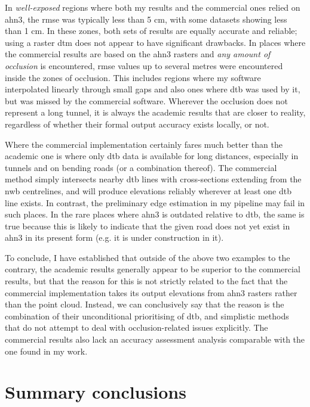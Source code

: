 In \textit{well-exposed} regions where both my results and the commercial ones relied on \ac{ahn3}, the \ac{rmse} was typically less than 5 cm, with some datasets showing less than 1 cm. In these zones, both sets of results are equally accurate and reliable; using a raster \ac{dtm} does not appear to have significant drawbacks. In places where the commercial results are based on the \ac{ahn3} rasters and \textit{any amount of occlusion} is encountered, \ac{rmse} values up to several metres were encountered inside the zones of occlusion. This includes regions where my software interpolated linearly through small gaps and also ones where \ac{dtb} was used by it, but was missed by the commercial software. Wherever the occlusion does not represent a long tunnel, it is always the academic results that are closer to reality, regardless of whether their formal output accuracy exists locally, or not.

Where the commercial implementation certainly fares much better than the academic one is where only \ac{dtb} data is available for long distances, especially in tunnels and on bending roads (or a combination thereof). The commercial method simply intersects nearby \ac{dtb} lines with cross-sections extending from the \ac{nwb} centrelines, and will produce elevations reliably wherever at least one \ac{dtb} line exists. In contrast, the preliminary edge estimation in my pipeline may fail in such places. In the rare places where \ac{ahn3} is outdated relative to \ac{dtb}, the same is true because this is likely to indicate that the given road does not yet exist in \ac{ahn3} in its present form (e.g. it is under construction in it).

To conclude, I have established that outside of the above two examples to the contrary, the academic results generally appear to be superior to the commercial results, but that the reason for this is not strictly related to the fact that the commercial implementation takes its output elevations from \ac{ahn3} rasters rather than the point cloud. Instead, we can conclusively say that the reason is the combination of their unconditional prioritising of \ac{dtb}, and simplistic methods that do not attempt to deal with occlusion-related issues explicitly. The commercial results also lack an accuracy assessment analysis comparable with the one found in my work.

\section{Summary conclusions}
\label{sec:conclusions}

